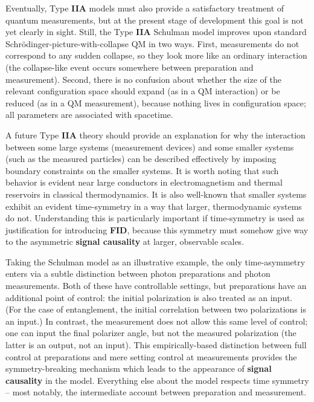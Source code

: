 \documentclass[rmp, aps, preprint, longbibliography]{revtex4-1}
\begin{document}
Eventually, Type {\bf IIA} models must also provide a satisfactory treatment of quantum measurements, but at the present stage of development this goal is not yet clearly in sight.  Still, the Type {\bf IIA} Schulman model improves upon standard Schr\"odinger-picture-with-collapse QM in two ways.  First, measurements do not correspond to any sudden collapse, so they look more like an ordinary interaction (the collapse-like event occurs somewhere between preparation and measurement).  Second, there is no confusion about whether the size of the relevant configuration space should expand (as in a QM interaction) or be reduced (as in a QM measurement), because nothing lives in configuration space; all parameters are associated with spacetime.

A future Type {\bf IIA} theory should provide an explanation for why the interaction between some large systems (measurement devices) and some smaller systems (such as the measured particles) can be described effectively by imposing boundary constraints on the smaller systems.  It is worth noting that such behavior is evident near large conductors in electromagnetism and thermal reservoirs in classical thermodynamics.  It is also well-known that smaller systems exhibit an evident time-symmetry in a way that larger, thermodynamic systems do not.  Understanding this is particularly important if time-symmetry is used as justification for introducing {\bf FID}, because this symmetry must somehow give way to the asymmetric {\bf signal causality} at larger, observable scales.

Taking the Schulman model as an illustrative example, the only time-asymmetry enters via a subtle distinction between photon preparations and photon measurements.  Both of these have controllable settings, but preparations have an additional point of control: the initial polarization is also treated as an input.  (For the case of entanglement, the initial correlation between two polarizations is an input.)  In contrast, the measurement does not allow this same level of control; one can input the final polarizer angle, but not the measured polarization (the latter is an output, not an input).  This empirically-based distinction between full control at preparations and mere setting control at measurements provides the symmetry-breaking mechanism which leads to the appearance of {\bf signal causality} in the model.  Everything else about the model respects time symmetry -- most notably, the intermediate account between preparation and measurement.
\end{document}
